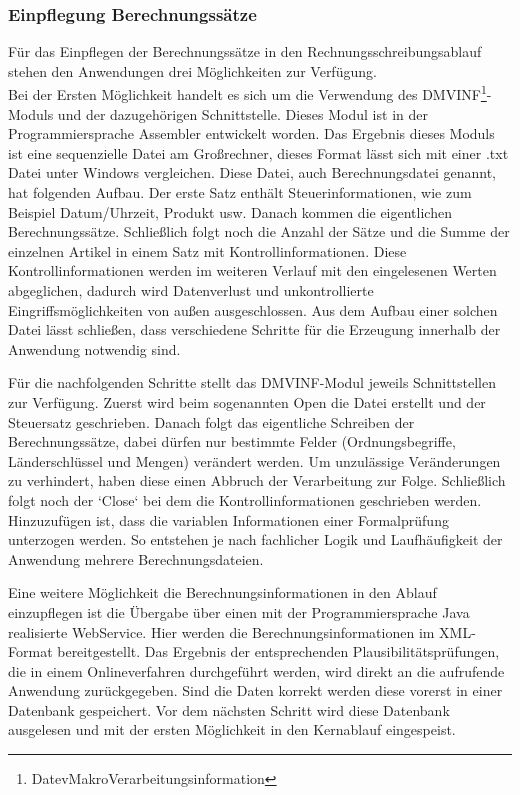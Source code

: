 \subsubsection{Einpflegung Berechnungssätze}
Für das Einpflegen der Berechnungssätze in den Rechnungsschreibungsablauf stehen den Anwendungen drei Möglichkeiten zur Verfügung. \\
Bei der Ersten Möglichkeit handelt es sich um die Verwendung des DMVINF\footnote{DatevMakroVerarbeitungsinformation}-Moduls und der dazugehörigen Schnittstelle.
Dieses Modul ist in der Programmiersprache Assembler entwickelt worden.
Das Ergebnis dieses Moduls ist eine sequenzielle Datei am Großrechner, dieses Format lässt sich mit einer .txt Datei unter Windows vergleichen.
Diese Datei, auch Berechnungsdatei genannt, hat folgenden Aufbau.
Der erste Satz enthält Steuerinformationen, wie zum Beispiel Datum/Uhrzeit, Produkt usw.
Danach kommen die eigentlichen Berechnungssätze.
Schließlich folgt noch die Anzahl der Sätze und die Summe der einzelnen Artikel in einem Satz mit Kontrollinformationen.
Diese Kontrollinformationen werden im weiteren Verlauf mit den eingelesenen Werten abgeglichen, dadurch wird Datenverlust und unkontrollierte Eingriffsmöglichkeiten von außen ausgeschlossen.
Aus dem Aufbau einer solchen Datei lässt schließen, dass verschiedene Schritte für die Erzeugung innerhalb der Anwendung notwendig sind.

Für die nachfolgenden Schritte stellt das DMVINF-Modul jeweils Schnittstellen zur Verfügung.
Zuerst wird beim sogenannten Open die Datei erstellt und der Steuersatz geschrieben.
Danach folgt das eigentliche Schreiben der Berechnungssätze, dabei dürfen nur bestimmte Felder (Ordnungsbegriffe, Länderschlüssel und Mengen) verändert werden.
Um unzulässige Veränderungen zu verhindert, haben diese einen Abbruch der Verarbeitung zur Folge.
Schließlich folgt noch der `Close` bei dem die Kontrollinformationen geschrieben werden.
Hinzuzufügen ist, dass die variablen Informationen einer Formalprüfung unterzogen werden.
So entstehen je nach fachlicher Logik und Laufhäufigkeit der Anwendung mehrere Berechnungsdateien.

Eine weitere Möglichkeit die Berechnungsinformationen in den Ablauf einzupflegen ist die Übergabe über einen mit der Programmiersprache Java realisierte WebService.
Hier werden die Berechnungsinformationen im XML-Format bereitgestellt.
Das Ergebnis der entsprechenden Plausibilitätsprüfungen, die in einem Onlineverfahren durchgeführt werden, wird direkt an die aufrufende Anwendung zurückgegeben.
Sind die Daten korrekt werden diese vorerst in einer Datenbank gespeichert.
Vor dem nächsten Schritt wird diese Datenbank ausgelesen und mit der ersten Möglichkeit in den Kernablauf eingespeist.

